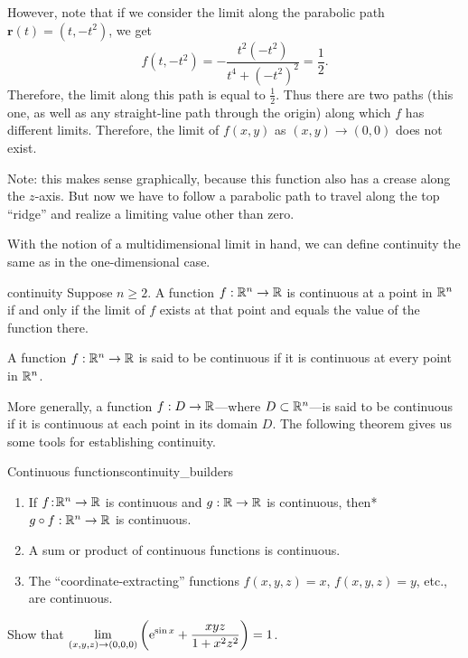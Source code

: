 \documentclass{watsonbook}
\begin{document}
\begin{solution}
  However, note that if we consider the limit along the parabolic
  path $\mathbf{r}(t) = (t, -t^2)$, we get
  \[
    f(t,-t^2) = -\frac{t^2(-t^2)}{t^4+(-t^2)^2} = \frac{1}{2}. 
  \]
  Therefore, the limit along this path is equal to
  $\tfrac{1}{2}$. Thus there are two paths (this one, as well as any
  straight-line path through the origin) along which $f$ has different
  limits. Therefore, the limit of $f(x,y)$ as $(x,y) \to (0,0)$ does
  not exist.
  
  Note: this makes sense graphically, because this function also has a
  crease along the $z$-axis. But now we have to follow a parabolic
  path to travel along the top ``ridge'' and realize a limiting value
  other than zero.
\end{solution}

With the notion of a multidimensional limit in hand, we can define
continuity the same as in the one-dimensional case.

\begin{defn}{}{continuity}
  Suppose $n \geq 2$. A function $f: \mathbb{R}^n \to \mathbb{R}$ is continuous at a
  point in $\mathbb{R}^n$ if and only if the limit of $f$ exists at that point
  and equals the value of the function there.

  A function $f: \mathbb{R}^n \to \mathbb{R}$ is said to be continuous if it is
  continuous at every point in $\mathbb{R}^n$.
\end{defn}

More generally, a function $f:D \to \mathbb{R}$---where $D \subset \mathbb{R}^n$---is
said to be continuous if it is continuous at each point in its
domain $D$. The following theorem gives us some tools for establishing
continuity. 

\begin{theo}{Continuous functions}{continuity_builders}
  \begin{enumerate}[leftmargin = 12pt]
  \item If $f  \!:\! \mathbb{R}^n \to \mathbb{R}$ is continuous and $g: \mathbb{R} \to \mathbb{R}$
    is continuous, then* $g\circ f :\mathbb{R}^n \to \mathbb{R}$ is
    continuous. 
  \item A sum or product of continuous functions is continuous. 
  \item The ``coordinate-extracting'' functions $f(x,y,z) = x$, $f(x,y,z) = y$, etc., are
    continuous.
  \end{enumerate}
\end{theo}

\begin{example}{}{}
  Show that $\displaystyle{\lim_{(x,y,z) \to (0,0,0)}\left(\mathrm{e}^{\sin x} + \frac{xyz}{1 + x^2
        z^2}\right)} = 1$. 
\end{example}
\end{document}
